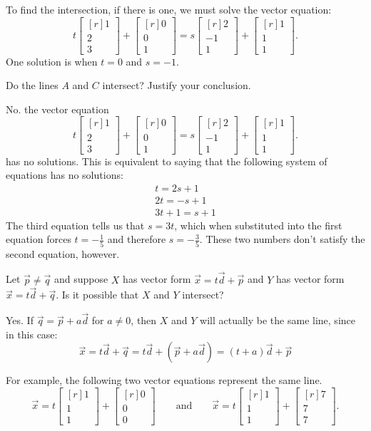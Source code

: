 \documentclass{problemset}
\newcommand{\mat}[1]{\begin{bmatrix*}[r]#1\end{bmatrix*}}
\begin{document}
\begin{parts}
\begin{solution}
				To find the intersection, if there is one, we must solve the vector equation:
				\[
					t\mat{1\\2\\3}+\mat{0\\0\\1} = s\mat{2\\-1\\1}+\mat{1\\1\\1}.
				\]
				One solution is when $t = 0$ and $s = -1$. 
			\end{solution}
		\item Do the lines $A$ and $C$ intersect? Justify your conclusion.
			\begin{solution}
				No. the vector equation 
				\[
					t\mat{1\\2\\3}+\mat{0\\0\\1} = s\mat{2\\-1\\1}+\mat{1\\1\\1}.
				\]
				has no solutions. This is equivalent to saying that the following 
				system of equations has no solutions:
				\begin{gather*}
					t = 2s + 1 \\
					2t = -s + 1 \\
					3t + 1 = s + 1
				\end{gather*}
				The third equation tells us that $s = 3t$, which when substituted 
				into the first equation forces $t = -\tfrac{1}{5}$ and therefore
				$s = -\tfrac{3}{5}$. These two numbers don't satisfy the second
				equation, however.
			\end{solution}
		\item Let $\vec p\neq \vec q$ and suppose
			$X$ has vector form $\vec x=t\vec d+\vec p$ and $Y$ has
			vector form $\vec x=t\vec d+\vec q$. Is it possible
			that $X$ and $Y$ intersect?
			\begin{solution}
				Yes. If $\vec q=\vec p+a\vec d$ for $a\neq 0$, then $X$ and $Y$
				will actually be the same line, since in this case:
				\[
					\vec x = t\vec d+\vec q 
					= t\vec d+(\vec p+a\vec d) 
					= (t+a)\vec d+\vec p
				\]

				For example, the following two vector equations represent the 
				same line.
				\[
					\vec x = t \mat{1\\1\\1} + \mat{0\\0\\0} 
					\qquad \text{and} \qquad
					\vec x = t \mat{1\\1\\1} + \mat{7\\7\\7}.
				\]
			\end{solution}
	\end{parts}
	
\end{document}
